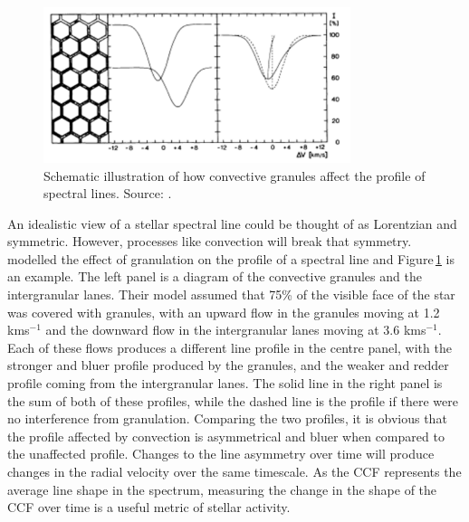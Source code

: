\begin{figure}
    \centering
    \includegraphics[width=0.8\textwidth]{LPV_convection.pdf}
    \caption{Schematic illustration of how convective granules affect the profile of spectral lines. Source: \citet{1981Dravins}.}
    \label{figLineProfile}
\end{figure}

An idealistic view of a stellar spectral line could be thought of as Lorentzian and symmetric. However, processes like convection will break that symmetry. \citet{1981Dravins} modelled the effect of granulation on the profile of a spectral line and Figure\,\ref{figLineProfile} is an example. The left panel is a diagram of the convective granules and the intergranular lanes. Their model assumed that 75\% of the visible face of the star was covered with granules, with an upward flow in the granules moving at 1.2 kms$^{-1}$ and the downward flow in the intergranular lanes moving at 3.6 kms$^{-1}$. Each of these flows produces a different line profile in the centre panel, with the stronger and bluer profile produced by the granules, and the weaker and redder profile coming from the intergranular lanes. The solid line in the right panel is the sum of both of these profiles, while the dashed line is the profile if there were no interference from granulation. Comparing the two profiles, it is obvious that the profile affected by convection is asymmetrical and bluer when compared to the unaffected profile. Changes to the line asymmetry over time will produce changes in the radial velocity over the same timescale. As the CCF represents the average line shape in the spectrum, measuring the change in the shape of the CCF over time is a useful metric of stellar activity.\\

